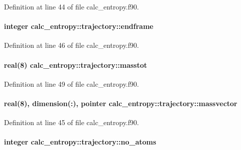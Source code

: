 Definition at line 44 of file calc\-\_\-entropy.\-f90.

\hypertarget{structcalc__entropy_1_1trajectory_a96ae41a3e3c46382771def88367baadf}{
\paragraph[{endframe}]{\setlength{\rightskip}{0pt plus 5cm}integer calc\-\_\-entropy\-::trajectory\-::endframe}}\label{structcalc__entropy_1_1trajectory_a96ae41a3e3c46382771def88367baadf}


Definition at line 46 of file calc\-\_\-entropy.\-f90.

\hypertarget{structcalc__entropy_1_1trajectory_a994705bd976a2bba0cc174650708de37}{
\paragraph[{masstot}]{\setlength{\rightskip}{0pt plus 5cm}real(8) calc\-\_\-entropy\-::trajectory\-::masstot}}\label{structcalc__entropy_1_1trajectory_a994705bd976a2bba0cc174650708de37}


Definition at line 49 of file calc\-\_\-entropy.\-f90.

\hypertarget{structcalc__entropy_1_1trajectory_a932ec0d37a55f606eb14f1eac76d9a0e}{
\paragraph[{massvector}]{\setlength{\rightskip}{0pt plus 5cm}real(8), dimension(\-:), pointer calc\-\_\-entropy\-::trajectory\-::massvector}}\label{structcalc__entropy_1_1trajectory_a932ec0d37a55f606eb14f1eac76d9a0e}


Definition at line 45 of file calc\-\_\-entropy.\-f90.

\hypertarget{structcalc__entropy_1_1trajectory_a3330471076fd4696308976155a625fb0}{
\paragraph[{no\-\_\-atoms}]{\setlength{\rightskip}{0pt plus 5cm}integer calc\-\_\-entropy\-::trajectory\-::no\-\_\-atoms}}\label{structcalc__entropy_1_1trajectory_a3330471076fd4696308976155a625fb0}


